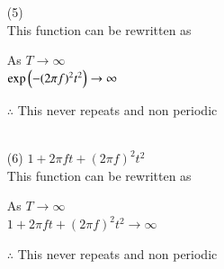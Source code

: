 \documentclass[journal,12pt,twocolumn]{IEEEtran}
\theoremstyle{remark}
\begin{document}
\begin{enumerate}
 \item[(5)]  \\

This function can be rewritten as\\ 
       \begin{center}
     As $T\to\infty$\\
    $\text{exp}\left(-(2\pi f)^2 t^2\right)\to \infty$\\ 
       \end{center}
    $\therefore$  This never repeats and non periodic\\
    \\
    
 \item[(6)] $1+2\pi f t+(2\pi f)^2t^2$\\

This function can be rewritten as\\ 
 \begin{center}
  As $T\to\infty$\\
  $1+2\pi f t+(2\pi f)^2t^2  \to \infty$\\
  \end{center}
  $\therefore$ This never repeats and non periodic\\ 
\end{enumerate}

 \renewcommand{\thefigure}{\theenumi}
 \renewcommand{\thetable}{\theenumi}
 
\end{document}

